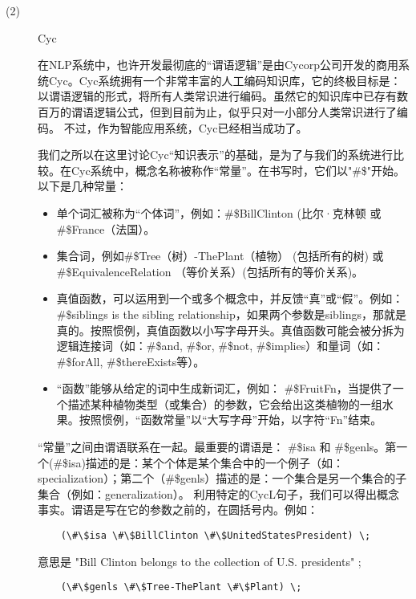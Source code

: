 \begin{enumerate}
\begin{description}
\item[(2)]  Cyc

在NLP系统中，也许开发最彻底的“谓语逻辑”是由Cycorp公司开发的商用系统Cyc\cite{Lenat1990}。Cyc系统拥有一个非常丰富的人工编码知识库，它的终极目标是：以谓语逻辑的形式，将所有人类常识进行编码。虽然它的知识库中已存有数百万的谓语逻辑公式，但到目前为止，似乎只对一小部分人类常识进行了编码。 不过，作为智能应用系统，Cyc已经相当成功了。

我们之所以在这里讨论Cyc“知识表示”的基础，是为了与我们的系统进行比较。在Cyc系统中，概念名称被称作“常量”。在书写时，它们以"\#\$"开始。以下是几种常量：

\begin{itemize}
\item 单个词汇被称为“个体词”，例如：\#\$BillClinton (比尔·克林顿 或 \#\$France（法国）。
\item 集合词，例如\#\$Tree（树）-ThePlant（植物） (包括所有的树) 或 \#\$EquivalenceRelation （等价关系）(包括所有的等价关系)。
\item 真值函数，可以运用到一个或多个概念中，并反馈“真”或“假”。例如：\#\$siblings is the sibling relationship，如果两个参数是siblings，那就是真的。按照惯例，真值函数以小写字母开头。真值函数可能会被分拆为逻辑连接词（如：\#\$and, \#\$or, \#\$not, \#\$implies）和量词（如：\#\$forAll, \#\$thereExists等）。
\item “函数”能够从给定的词中生成新词汇，例如：
\#\$FruitFn，当提供了一个描述某种植物类型（或集合）的参数，它会给出这类植物的一组水果。按照惯例，“函数常量”以“大写字母”开始，以字符“Fn”结束。
\end{itemize}

“常量”之间由谓语联系在一起。最重要的谓语是： \#\$isa 和 \#\$genls。第一个(\#\$isa)描述的是：某个个体是某个集合中的一个例子（如：specialization）；第二个（\#\$genls）描述的是：一个集合是另一个集合的子集合（例如：generalization）。
利用特定的CycL句子，我们可以得出概念事实。谓语是写在它的参数之前的，在圆括号内。例如：

 {\tt\begin{small}\begin{lstlisting}
    (\#\$isa \#\$BillClinton \#\$UnitedStatesPresident) \;
    \end{lstlisting}\end{small}}

\noindent 意思是 "Bill Clinton belongs to the collection of U.S. presidents" ;

 {\tt\begin{small}\begin{lstlisting}
    (\#\$genls \#\$Tree-ThePlant \#\$Plant) \;
    \end{lstlisting}\end{small}}


\end{description}
\end{enumerate}
